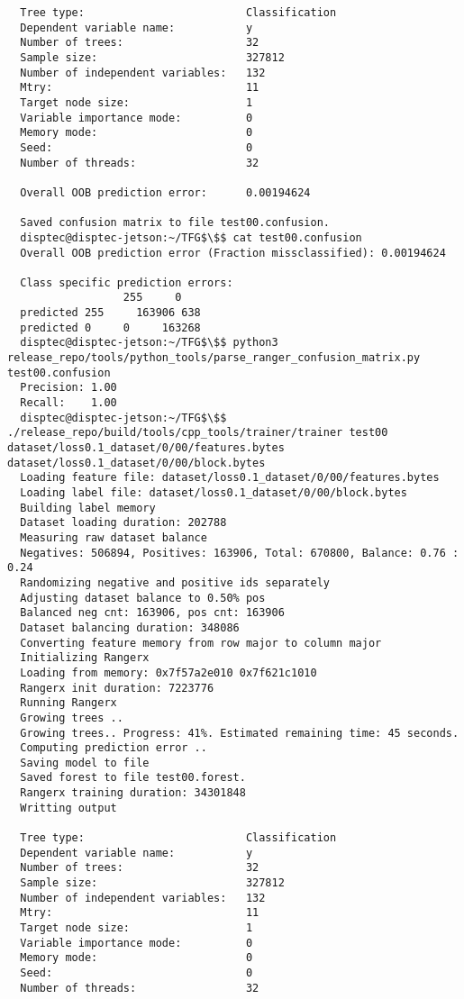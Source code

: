 \documentclass[12pt,oneside]{book}
\begin{document}
\begin{lstlisting}
  Tree type:                         Classification
  Dependent variable name:           y
  Number of trees:                   32
  Sample size:                       327812
  Number of independent variables:   132
  Mtry:                              11
  Target node size:                  1
  Variable importance mode:          0
  Memory mode:                       0
  Seed:                              0
  Number of threads:                 32
  
  Overall OOB prediction error:      0.00194624
  
  Saved confusion matrix to file test00.confusion.
  disptec@disptec-jetson:~/TFG$\$$ cat test00.confusion 
  Overall OOB prediction error (Fraction missclassified): 0.00194624
  
  Class specific prediction errors:
                  255     0
  predicted 255     163906 638   
  predicted 0     0     163268 
  disptec@disptec-jetson:~/TFG$\$$ python3 release_repo/tools/python_tools/parse_ranger_confusion_matrix.py test00.confusion 
  Precision: 1.00
  Recall:    1.00
  disptec@disptec-jetson:~/TFG$\$$ ./release_repo/build/tools/cpp_tools/trainer/trainer test00 dataset/loss0.1_dataset/0/00/features.bytes dataset/loss0.1_dataset/0/00/block.bytes 
  Loading feature file: dataset/loss0.1_dataset/0/00/features.bytes
  Loading label file: dataset/loss0.1_dataset/0/00/block.bytes
  Building label memory
  Dataset loading duration: 202788
  Measuring raw dataset balance
  Negatives: 506894, Positives: 163906, Total: 670800, Balance: 0.76 : 0.24
  Randomizing negative and positive ids separately
  Adjusting dataset balance to 0.50% pos
  Balanced neg cnt: 163906, pos cnt: 163906
  Dataset balancing duration: 348086
  Converting feature memory from row major to column major
  Initializing Rangerx
  Loading from memory: 0x7f57a2e010 0x7f621c1010
  Rangerx init duration: 7223776
  Running Rangerx
  Growing trees ..
  Growing trees.. Progress: 41%. Estimated remaining time: 45 seconds.
  Computing prediction error ..
  Saving model to file
  Saved forest to file test00.forest.
  Rangerx training duration: 34301848
  Writting output
  
  Tree type:                         Classification
  Dependent variable name:           y
  Number of trees:                   32
  Sample size:                       327812
  Number of independent variables:   132
  Mtry:                              11
  Target node size:                  1
  Variable importance mode:          0
  Memory mode:                       0
  Seed:                              0
  Number of threads:                 32
  

\end{lstlisting}
\end{document}
